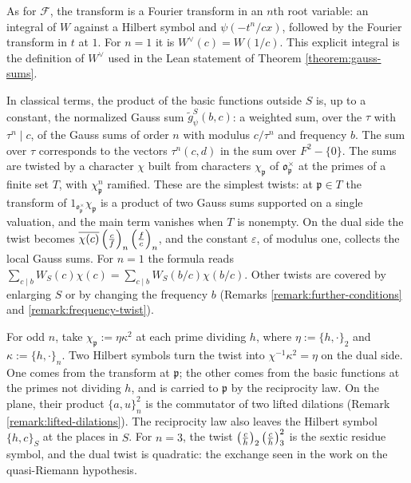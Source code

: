 \begin{sketch}
  As for $\mathcal{F}$, the transform is a Fourier transform in an $n$th root variable: an integral of $W$ against a Hilbert symbol and $\psi(-t^n / c x)$, followed by the Fourier transform in $t$ at $1$.  For $n = 1$ it is $W^\vee(c) = W(1/c)$.  This explicit integral is the definition of $W^\vee$ used in the Lean statement of Theorem \ref{theorem:gauss-sums}.
\end{sketch}

\begin{sketch}
  In classical terms, the product of the basic functions outside $S$ is, up to a constant, the normalized Gauss sum $\tilde{g}_\psi^S(b, c)$: a weighted sum, over the $\tau$ with $\tau^n \mid c$, of the Gauss sums of order $n$ with modulus $c / \tau^n$ and frequency $b$.  The sum over $\tau$ corresponds to the vectors $\tau^n (c, d)$ in the sum over $F^2 - \{0\}$.  The sums are twisted by a character $\chi$ built from characters $\chi_{\mathfrak{p}}$ of $\mathfrak{o}_{\mathfrak{p}}^\times$ at the primes of a finite set $T$, with $\chi_{\mathfrak{p}}^n$ ramified.  These are the simplest twists: at $\mathfrak{p} \in T$ the transform of $1_{\mathfrak{o}_{\mathfrak{p}}^\times} \chi_{\mathfrak{p}}$ is a product of two Gauss sums supported on a single valuation, and the main term vanishes when $T$ is nonempty.  On the dual side the twist becomes $\overline{\chi(c)} \left( \frac{c}{f} \right)_n \left( \frac{f}{c} \right)_n$, and the constant $\varepsilon$, of modulus one, collects the local Gauss sums.  For $n = 1$ the formula reads $\sum_{c \mid b} W_S(c) \chi(c) = \sum_{c \mid b} W_S(b / c) \chi(b / c)$.  Other twists are covered by enlarging $S$ or by changing the frequency $b$ (Remarks \ref{remark:further-conditions} and \ref{remark:frequency-twist}).
\end{sketch}

\begin{sketch}
  For odd $n$, take $\chi_{\mathfrak{p}} := \eta \kappa^2$ at each prime dividing $h$, where $\eta := \{h, \cdot\}_2$ and $\kappa := \{h, \cdot\}_n$.  Two Hilbert symbols turn the twist into $\chi^{-1} \kappa^2 = \eta$ on the dual side.  One comes from the transform at $\mathfrak{p}$; the other comes from the basic functions at the primes not dividing $h$, and is carried to $\mathfrak{p}$ by the reciprocity law.  On the plane, their product $\{a, u\}_n^2$ is the commutator of two lifted dilations (Remark \ref{remark:lifted-dilations}).  The reciprocity law also leaves the Hilbert symbol $\{h, c\}_S$ at the places in $S$.  For $n = 3$, the twist $\left( \frac{c}{h} \right)_2 \left( \frac{c}{h} \right)_3^2$ is the sextic residue symbol, and the dual twist is quadratic: the exchange seen in the work on the quasi-Riemann hypothesis.
\end{sketch}

